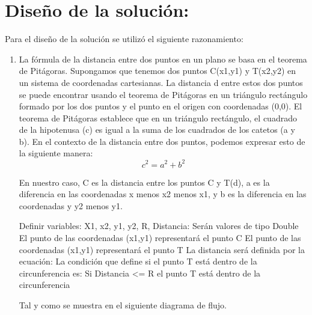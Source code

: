 \documentclass{IEEEcsmag}
\begin{document}
\section*{Diseño de la solución:}
\setlength{\parskip}{5pt}
Para el diseño de la solución se utilizó el siguiente razonamiento:
\begin{enumerate}
    \item La fórmula de la distancia entre dos puntos en un plano se basa en el teorema de Pitágoras. Supongamos que tenemos dos puntos C(x1,y1) y T(x2,y2) en un sistema de coordenadas cartesianas. La distancia d entre estos dos puntos se puede encontrar usando el teorema de Pitágoras en un triángulo rectángulo formado por los dos puntos y el punto en el origen con coordenadas (0,0).\newline
    \newline
    El teorema de Pitágoras establece que en un triángulo rectángulo, el cuadrado de la hipotenusa (c) es igual a la suma de los cuadrados de los catetos (a y b). En el contexto de la distancia entre dos puntos, podemos expresar esto de la siguiente manera:
    \begin{equation}
        c^2 = a^2 + b^2
    \end{equation}

    En nuestro caso, C es la distancia entre los puntos C y T(d), a es la diferencia en las coordenadas x menos x2 menos x1, y b es la diferencia en las coordenadas y y2 menos y1.

    Definir variables:\newline
    X1, x2, y1, y2, R, Distancia: Serán valores de tipo Double\newline
    El punto de las coordenadas (x1,y1) representará el punto C\newline
    El punto de las coordenadas (x1,y1) representará el punto T\newline
    La distancia será definida por la ecuación: \newline
    La condición que define si el punto T está dentro de la circunferencia es: \newline
    Si Distancia <= R el punto T está dentro de la circunferencia \newline

    Tal y como se muestra en el siguiente diagrama de flujo.


\end{enumerate}
\end{document}
